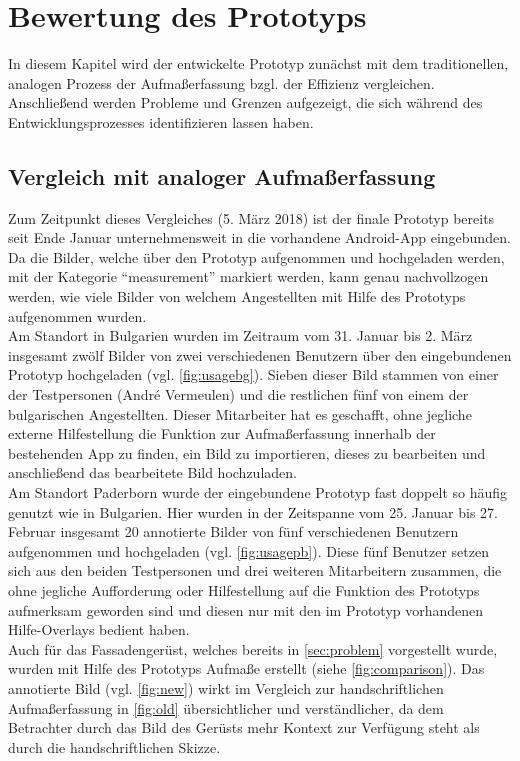 \chapter{Bewertung des Prototyps}
In diesem Kapitel wird der entwickelte Prototyp zunächst mit dem traditionellen, analogen Prozess der Aufmaßerfassung bzgl. der Effizienz vergleichen.
Anschließend werden Probleme und Grenzen aufgezeigt, die sich während des Entwicklungsprozesses identifizieren lassen haben.

\section{Vergleich mit analoger Aufmaßerfassung}
Zum Zeitpunkt dieses Vergleiches (5. März 2018) ist der finale Prototyp bereits seit Ende Januar unternehmensweit in die vorhandene Android-App eingebunden.
Da die Bilder, welche über den Prototyp aufgenommen und hochgeladen werden, mit der Kategorie ``measurement'' markiert werden, kann genau nachvollzogen werden, wie viele Bilder von welchem Angestellten mit Hilfe des Prototyps aufgenommen wurden. \\

Am Standort in Bulgarien wurden im Zeitraum vom 31. Januar bis 2. März insgesamt zwölf Bilder von zwei verschiedenen Benutzern über den eingebundenen Prototyp hochgeladen (vgl. \autoref{fig:usagebg}).
Sieben dieser Bild stammen von einer der Testpersonen (André Vermeulen) und die restlichen fünf von einem der bulgarischen Angestellten.
Dieser Mitarbeiter hat es geschafft, ohne jegliche externe Hilfestellung die Funktion zur Aufmaßerfassung innerhalb der bestehenden App zu finden, ein Bild zu importieren, dieses zu bearbeiten und anschließend das bearbeitete Bild hochzuladen. \\

Am Standort Paderborn wurde der eingebundene Prototyp fast doppelt so häufig genutzt wie in Bulgarien.
Hier wurden in der Zeitspanne vom 25. Januar bis 27. Februar insgesamt 20 annotierte Bilder von fünf verschiedenen Benutzern aufgenommen und hochgeladen (vgl. \autoref{fig:usagepb}).
Diese fünf Benutzer setzen sich aus den beiden Testpersonen und drei weiteren Mitarbeitern zusammen, die ohne jegliche Aufforderung oder Hilfestellung auf die Funktion des Prototyps aufmerksam geworden sind und diesen nur mit den im Prototyp vorhandenen Hilfe-Overlays bedient haben. \\

Auch für das Fassadengerüst, welches bereits in \autoref{sec:problem} vorgestellt wurde, wurden mit Hilfe des Prototyps Aufmaße erstellt (siehe \autoref{fig:comparison}).
Das annotierte Bild (vgl. \autoref{fig:new}) wirkt im Vergleich zur handschriftlichen Aufmaßerfassung in \autoref{fig:old} übersichtlicher und verständlicher, da dem Betrachter durch das Bild des Gerüsts mehr Kontext zur Verfügung steht als durch die handschriftlichen Skizze. \\

